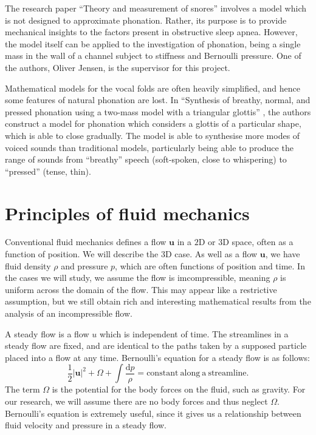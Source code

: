\documentclass{book}
\begin{document}
The research paper ``Theory and measurement of snores'' \cite[1993]{gavriely_jensen_1993} involves a model which is not designed to approximate phonation.
Rather, its purpose is to provide mechanical insights to the factors present in obstructive sleep apnea.
However, the model itself can be applied to the investigation of phonation,
being a single mass in the wall of a channel subject to stiffness and Bernoulli pressure.
One of the authors, Oliver Jensen, is the supervisor for this project.

Mathematical models for the vocal folds are often heavily simplified, and hence some features of natural phonation are lost.
In ``Synthesis of breathy, normal, and pressed phonation using a two-mass model with a triangular glottis'' \cite[2011]{birkholz_2011},
the authors construct a model for phonation which considers a glottis of a particular shape, which is able to close gradually.
The model is able to synthesise more modes of voiced sounds than traditional models,
particularly being able to produce the range of sounds from ``breathy'' speech (soft-spoken, close to whispering) to ``pressed'' (tense, thin). 

\section{Principles of fluid mechanics}

Conventional fluid mechanics defines a flow $\mathbf{u}$ in a $2$D or $3$D space,
often as a function of position.
We will describe the $3$D case.
As well as a flow $\mathbf{u}$,
we have fluid density $\rho$ and pressure $p$,
which are often functions of position and time.
In the cases we will study,
we assume the flow is imcompressible,
meaning $\rho$ is uniform across the domain of the flow.
This may appear like a restrictive assumption,
but we still obtain rich and interesting mathematical results from the analysis of an incompressible flow.

A steady flow is a flow $u$ which is independent of time.
The streamlines in a steady flow are fixed, and are identical to the paths taken by a supposed particle placed into a flow at any time.
Bernoulli's equation for a steady flow is as follows:
\begin{equation}
    \frac{1}{2}|\mathbf{u}|^2 + \Omega + \int\frac{\mathrm{d}p}{\rho} = \mathrm{constant~along~a~streamline}.
\end{equation}
The term $\Omega$ is the potential for the body forces on the fluid, such as gravity.
For our research, we will assume there are no body forces and thus neglect $\Omega$.
Bernoulli's equation is extremely useful, since it gives us a relationship between fluid velocity and pressure in a steady flow.
\end{document}
